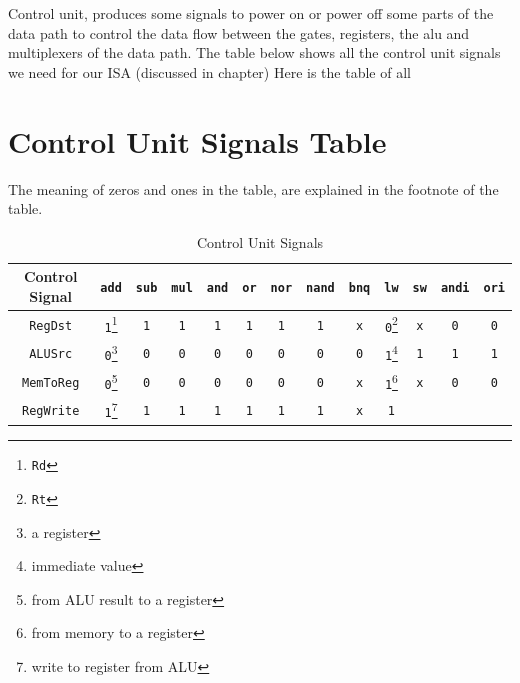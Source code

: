 \documentclass[12pt, dvipsnames, svgnames, x11names, oneside]{book}
\begin{document}
		Control unit, produces some signals to power on or power off some parts of the data path to control the data flow between the gates, registers, the alu and multiplexers of the data path. The table below shows all the control unit signals we need for our ISA (discussed in  chapter)
		Here is the table of all 
		
		\section{Control Unit Signals Table}
		
			The meaning of zeros and ones in the table, are explained in the footnote of the table.
					
		\begin{table}
			\caption{Control Unit Signals}
			\begin{center}
				\begin{tabular}{|c|c|c|c|c|c|c|c|c|c|c|c|c|}
					\hline
					Control Signal &
					\texttt{add} &
					\texttt{sub} &
					\texttt{mul} &
					\texttt{and} &
					\texttt{or} &
					\texttt{nor} &
					\texttt{nand} &
					\texttt{bnq} &
					\texttt{lw} &
					\texttt{sw} &
					\texttt{andi} &
					\texttt{ori} \\
					\hline
					\hline
					\texttt{RegDst} & 
					\texttt{1}\footnote{\texttt{Rd}} &
					\texttt{1} &
					\texttt{1} &
					\texttt{1} &
					\texttt{1} &
					\texttt{1} &
					\texttt{1} &
					\texttt{x} &
					\texttt{0}\footnote{\texttt{Rt}} &
					\texttt{x} &
					\texttt{0} &
					\texttt{0} \\
					\hline
					\texttt{ALUSrc} &
					\texttt{0}\footnote{a register} &
					\texttt{0} &
					\texttt{0} &
					\texttt{0} &
					\texttt{0} &
					\texttt{0} &
					\texttt{0} &
					\texttt{0} &
					\texttt{1}\footnote{immediate value} &
					\texttt{1} &
					\texttt{1} &
					\texttt{1} \\ 
					\hline
					\texttt{MemToReg} &
					\texttt{0}\footnote{from ALU result to a register} &
					\texttt{0} &
					\texttt{0} &
					\texttt{0} &
					\texttt{0} &
					\texttt{0} &
					\texttt{0} &
					\texttt{x} &
					\texttt{1}\footnote{from memory to a register} &
					\texttt{x} &
					\texttt{0} &
					\texttt{0} \\ 
					\hline
					\texttt{RegWrite} &
					\texttt{1}\footnote{write to register from ALU} &
					\texttt{1} &
					\texttt{1} &
					\texttt{1} &
					\texttt{1} &
					\texttt{1} &
					\texttt{1} &
					\texttt{x} &
					\texttt{1} &

\end{tabular}
\end{center}
\end{table}
\end{document}
